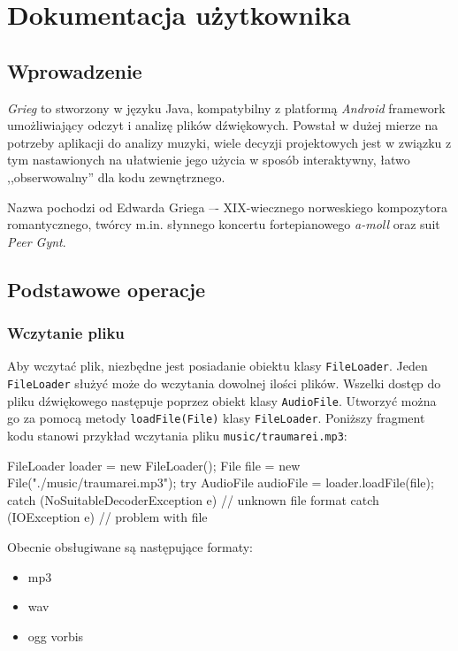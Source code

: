 
\chapter{Dokumentacja użytkownika}

\section{Wprowadzenie}

\emph{Grieg} to stworzony w języku Java, kompatybilny z platformą \textit{Android} framework
umożliwiający odczyt i analizę plików dźwiękowych. Powstał w dużej mierze na potrzeby aplikacji do
analizy muzyki, wiele decyzji projektowych jest w związku z tym nastawionych na ułatwienie jego
użycia w sposób interaktywny, łatwo ,,obserwowalny'' dla kodu zewnętrznego.

Nazwa pochodzi od Edwarda Griega –- XIX-wiecznego norweskiego kompozytora romantycznego, twórcy
m.in.  słynnego koncertu fortepianowego \textit{a-moll} oraz suit \textit{Peer Gynt}.

\section{Podstawowe operacje}

\subsection{Wczytanie pliku}

Aby wczytać plik, niezbędne jest posiadanie obiektu klasy \texttt{FileLoader}. Jeden
\texttt{FileLoader} służyć może do wczytania dowolnej ilości plików. Wszelki dostęp do pliku
dźwiękowego następuje poprzez obiekt klasy \texttt{AudioFile}. Utworzyć można go za pomocą metody
\texttt{loadFile(File)} klasy \texttt{FileLoader}.  Poniższy fragment kodu stanowi przykład
wczytania pliku \texttt{music/traumarei.mp3}:

\begin{java}
FileLoader loader = new FileLoader();
File file = new File("./music/traumarei.mp3");
try {
    AudioFile audioFile = loader.loadFile(file);
} catch (NoSuitableDecoderException e) {
    // unknown file format
} catch (IOException e) {
    // problem with file
}
\end{java}

Obecnie obsługiwane są następujące formaty:

\begin{itemize}
  \item mp3
  \item wav
  \item ogg vorbis
\end{itemize}

